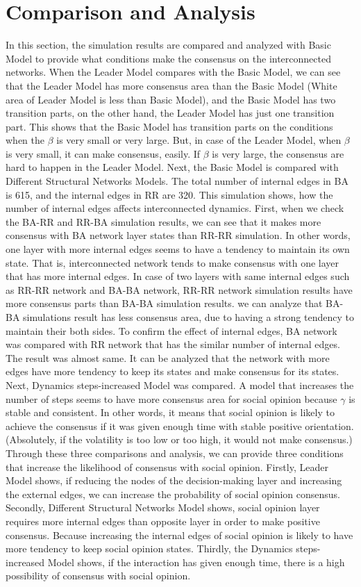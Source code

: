 \documentclass[english]{cccconf}
\begin{document}
\section{Comparison and Analysis}
In this section, the simulation results are compared and analyzed with Basic Model to provide what conditions make the consensus on the interconnected networks. When the Leader Model compares with the Basic Model, we can see that the Leader Model has more consensus area than the Basic Model (White area of Leader Model is less than Basic Model), and the Basic Model has two transition parts, on the other hand, the Leader Model has just one transition part. This shows that the Basic Model has transition parts on the conditions when the $\beta$ is very small or very large. But, in case of the Leader Model, when $\beta$ is very small, it can make consensus, easily. If $\beta$ is very large, the consensus are hard to happen in the Leader Model.
Next, the Basic Model is compared with Different Structural Networks Models. The total number of internal edges in BA is 615, and the internal edges in RR are 320. This simulation shows, how the number of internal edges affects interconnected dynamics. First, when we check the BA-RR and RR-BA simulation results, we can see that it makes more consensus with BA network layer states than RR-RR simulation. In other words, one layer with more internal edges seems to have a tendency to maintain its own state. That is, interconnected network tends to make consensus with one layer that has more internal edges. In case of two layers with same internal edges such as RR-RR network and BA-BA network, RR-RR network simulation results have more consensus parts than BA-BA simulation results. we can analyze that BA-BA simulations result has less consensus area, due to having a strong tendency to maintain their both sides. To confirm the effect of internal edges, BA network was compared with RR network that has the similar number of internal edges. The result was almost same. It can be analyzed that the network with more edges have more tendency to keep its states and make consensus for its states.
Next, Dynamics steps-increased Model was compared. A model that increases the number of steps seems to have more consensus area for social opinion because $\gamma$ is stable and consistent. In other words, it means that social opinion is likely to achieve the consensus if it was given enough time with stable positive orientation.(Absolutely, if the volatility is too low or too high, it would not make consensus.) \\ 
Through these three comparisons and analysis, we can provide three conditions that increase the likelihood of consensus with social opinion. Firstly, Leader Model shows, if reducing the nodes of the decision-making layer and increasing the external edges, we can increase the probability of social opinion consensus. Secondly, Different Structural Networks Model shows, social opinion layer requires more internal edges than opposite layer in order to make positive consensus. Because increasing the internal edges of social opinion is likely to have more tendency to keep social opinion states. Thirdly, the Dynamics steps-increased Model shows, if the interaction has given enough time, there is a high possibility of consensus with social opinion.
\end{document}
